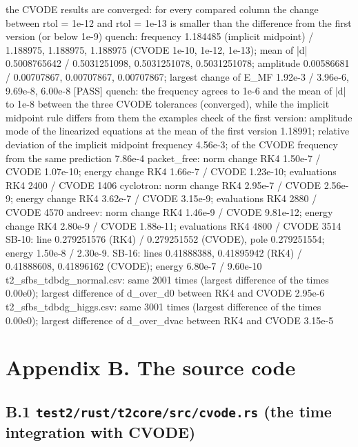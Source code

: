 \documentclass[
  10pt,
]{article}
\newenvironment{Shaded}{}{}
\newcommand{\NormalTok}[1]{#1}
\begin{document}
\begin{Shaded}
\begin{Highlighting}[]
\NormalTok{[PASS] the CVODE results are converged: for every compared column the change between rtol = 1e{-}12 and rtol = 1e{-}13 is smaller than the difference from the first version (or below 1e{-}9)}
\NormalTok{quench: frequency 1.184485 (implicit midpoint) / 1.188975, 1.188975, 1.188975 (CVODE 1e{-}10, 1e{-}12, 1e{-}13); mean of |d| 0.5008765642 / 0.5031251098, 0.5031251078, 0.5031251078; amplitude 0.00586681 / 0.00707867, 0.00707867, 0.00707867; largest change of E\_MF 1.92e{-}3 / 3.96e{-}6, 9.69e{-}8, 6.00e{-}8}
\NormalTok{[PASS] quench: the frequency agrees to 1e{-}6 and the mean of |d| to 1e{-}8 between the three CVODE tolerances (converged), while the implicit midpoint rule differs from them}
\NormalTok{the examples check of the first version: amplitude mode of the linearized equations at the mean of the first version 1.18991; relative deviation of the implicit midpoint frequency 4.56e{-}3; of the CVODE frequency from the same prediction 7.86e{-}4}
\NormalTok{packet\_free: norm change RK4 1.50e{-}7 / CVODE 1.07e{-}10; energy change RK4 1.66e{-}7 / CVODE 1.23e{-}10; evaluations RK4 2400 / CVODE 1406}
\NormalTok{cyclotron: norm change RK4 2.95e{-}7 / CVODE 2.56e{-}9; energy change RK4 3.62e{-}7 / CVODE 3.15e{-}9; evaluations RK4 2880 / CVODE 4570}
\NormalTok{andreev: norm change RK4 1.46e{-}9 / CVODE 9.81e{-}12; energy change RK4 2.80e{-}9 / CVODE 1.88e{-}11; evaluations RK4 4800 / CVODE 3514}
\NormalTok{SB{-}10: line 0.279251576 (RK4) / 0.279251552 (CVODE), pole 0.279251554; energy 1.50e{-}8 / 2.30e{-}9. SB{-}16: lines 0.41888388, 0.41895942 (RK4) / 0.41888608, 0.41896162 (CVODE); energy 6.80e{-}7 / 9.60e{-}10}
\NormalTok{t2\_sfbs\_tdbdg\_normal.csv: same 2001 times (largest difference of the times 0.00e0); largest difference of d\_over\_d0 between RK4 and CVODE 2.95e{-}6}
\NormalTok{t2\_sfbs\_tdbdg\_higgs.csv: same 3001 times (largest difference of the times 0.00e0); largest difference of d\_over\_dvac between RK4 and CVODE 3.15e{-}5}
\end{Highlighting}
\end{Shaded}

\hypertarget{appendix-b.-the-source-code}{%
\section{Appendix B. The source
code}\label{appendix-b.-the-source-code}}

\hypertarget{b.1-test2rustt2coresrccvode.rs-the-time-integration-with-cvode}{%
\subsection{\texorpdfstring{B.1 \texttt{test2/rust/t2core/src/cvode.rs}
(the time integration with
CVODE)}{B.1 test2/rust/t2core/src/cvode.rs (the time integration with CVODE)}}\label{b.1-test2rustt2coresrccvode.rs-the-time-integration-with-cvode}}
\end{document}
